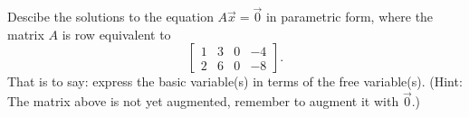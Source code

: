 \documentclass[answers,11pt]{exam}
\theoremstyle{definition}
\theoremstyle{definition}
\DeclareMathOperator{\1}{\mathbbm{1}}
\begin{document}
\begin{questions}

\question[25] Descibe the solutions to the equation $A\vec{x}=\vec{0}$ in parametric form, where the matrix $A$ is row equivalent to 
\begin{equation*}
\begin{bmatrix}
1&3&0&-4\\
2&6&0&-8
\end{bmatrix}.
\end{equation*}
That is to say: express the basic variable(s) in terms of the free variable(s). (Hint: The matrix above is not yet augmented, remember to augment it with $\vec{0}$.)
\addpoints


\begin{solution}
	

\end{solution}
\end{questions}
\end{document}

